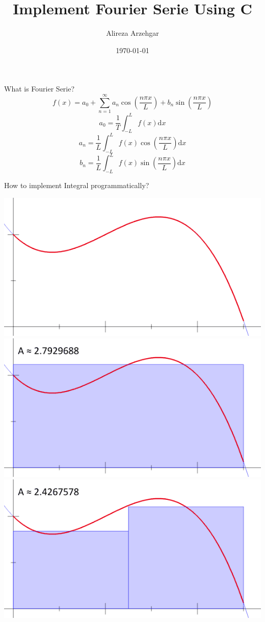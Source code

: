 \documentclass[xcolor={rgb}]{beamer}
\author{Alireza Arzehgar}
\title{Implement Fourier Serie Using C}
\institute{Azad University of Mashhad}
\date{\today}
\begin{document}
	\begin{frame}[plain]
		\titlepage
	\end{frame}

	\begin{frame}{What is Fourier Serie?}
		\pause
		\[ f(x) = a_0 + \sum_{n=1}^{\infty}a_n \cos(\frac{n \pi x}{L})+b_n \sin(\frac{n \pi x}{L}) \]
		\pause
		\[ a_0 = \frac1T \int_{-L}^{L} f(x)\mathrm{d}x \]
		\pause
		\[ a_n = \frac1L \int_{-L}^{L} f(x)\cos(\frac{n \pi x}{L})\mathrm{d}x \]
		\pause
		\[ b_n = \frac1L \int_{-L}^{L} f(x)\sin(\frac{n \pi x}{L})\mathrm{d}x \]
	\end{frame}
	
	\begin{frame}[fragile,c]{How to implement Integral programmatically?}
		\vspace*{0.5cm}
		\hspace*{0.5cm}
		\begin{overprint}
			\includegraphics[width=\textwidth]{assets/int-0.png}
			\onslide<3>
			\includegraphics[width=\textwidth]{assets/int-1.png}
			\onslide<4>
			\includegraphics[width=\textwidth]{assets/int-2.png}

\end{overprint}
\end{frame}
\end{document}
